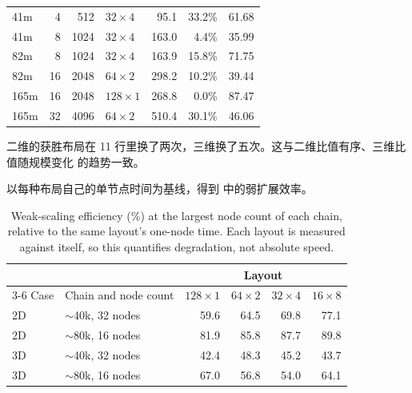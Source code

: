 \documentclass[11pt,a4paper,oneside]{report}
\begin{document}
\begin{table}[htbp]
\begin{tabular}{lrrlrrr}
    41m  &  4 &  512 & $32\times4$  &  95.1 & 33.2\% & 61.68 \\
    41m  &  8 & 1024 & $32\times4$  & 163.0 &  4.4\% & 35.99 \\
    82m  &  8 & 1024 & $32\times4$  & 163.9 & 15.8\% & 71.75 \\
    82m  & 16 & 2048 & $64\times2$  & 298.2 & 10.2\% & 39.44 \\
    165m & 16 & 2048 & $128\times1$ & 268.8 &  0.0\% & 87.47 \\
    165m & 32 & 4096 & $64\times2$  & 510.4 & 30.1\% & 46.06 \\
    \bottomrule
  \end{tabular}
\end{table}

二维的获胜布局在 11 行里换了两次，三维换了五次。这与二维比值有序、三维比值随规模变化
的趋势一致。

以每种布局自己的单节点时间为基线，得到  中的弱扩展效率。

\begin{table}[htbp]
  \centering
  \caption{Weak-scaling efficiency (\%) at the largest node count of each chain, relative
  to the same layout's one-node time. Each layout is measured against itself, so this
  quantifies degradation, not absolute speed.}
  \label{tab:weak-eff}
  \begin{tabular}{llrrrr}
    \toprule
    & & \multicolumn{4}{c}{Layout} \\
    \cmidrule(lr){3-6}
    Case & Chain and node count & $128\times1$ & $64\times2$ & $32\times4$ & $16\times8$ \\
    \midrule
    2D & $\sim$40k, 32 nodes & 59.6 & 64.5 & 69.8 & 77.1 \\
    2D & $\sim$80k, 16 nodes & 81.9 & 85.8 & 87.7 & 89.8 \\
    3D & $\sim$40k, 32 nodes & 42.4 & 48.3 & 45.2 & 43.7 \\
    3D & $\sim$80k, 16 nodes & 67.0 & 56.8 & 54.0 & 64.1 \\
    \bottomrule
  \end{tabular}
\end{table}
\end{document}

